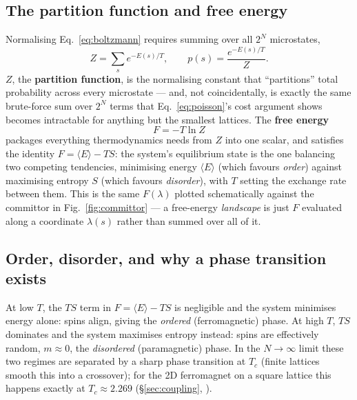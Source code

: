 \documentclass[11pt,a4paper]{article}
\begin{document}
\subsection{The partition function and free energy}
Normalising Eq.~\eqref{eq:boltzmann} requires summing over all $2^N$ microstates,
\begin{equation}\label{eq:partition}
Z=\sum_s e^{-E(s)/T},\qquad p(s)=\frac{e^{-E(s)/T}}{Z}.
\end{equation}
$Z$, the \textbf{partition function}, is the normalising constant that ``partitions'' total
probability across every microstate --- and, not coincidentally, is exactly the same
brute-force sum over $2^N$ terms that Eq.~\eqref{eq:poisson}'s cost argument shows becomes
intractable for anything but the smallest lattices. The \textbf{free energy}
\begin{equation}
F=-T\ln Z
\end{equation}
packages everything thermodynamics needs from $Z$ into one scalar, and satisfies the identity
$F=\langle E\rangle-TS$: the system's equilibrium state is the one balancing two competing
tendencies, minimising energy $\langle E\rangle$ (which favours \emph{order}) against maximising
entropy $S$ (which favours \emph{disorder}), with $T$ setting the exchange rate between them.
This is the same $F(\lambda)$ plotted schematically against the committor in
Fig.~\ref{fig:committor} --- a free-energy \emph{landscape} is just $F$ evaluated along a
coordinate $\lambda(s)$ rather than summed over all of it.

\subsection{Order, disorder, and why a phase transition exists}\label{sec:phasetransition}
At low $T$, the $TS$ term in $F=\langle E\rangle-TS$ is negligible and the system minimises
energy alone: spins align, giving the \emph{ordered} (ferromagnetic) phase. At high $T$, $TS$
dominates and the system maximises entropy instead: spins are effectively random, $m\approx0$,
the \emph{disordered} (paramagnetic) phase. In the $N\to\infty$ limit these two regimes are
separated by a sharp phase transition at $T_c$ (finite lattices smooth this into a crossover); for
the 2D ferromagnet on a square lattice this happens exactly at $T_c\approx2.269$
(\S\ref{sec:coupling}, \cite{onsager1944}).
\end{document}
